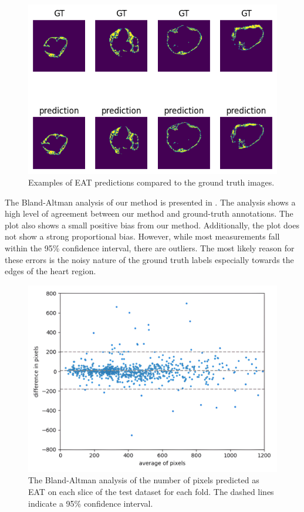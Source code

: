 \begin{figure}[h]
    \centering
    \includegraphics[width=0.7\columnwidth]{images/6/examples.png}
    \caption{Examples of EAT predictions compared to the ground truth images. \cite{bencevicEpicardialAdiposeTissue2021}}
    \label{fig:examples}
\end{figure}

The Bland-Altman analysis of our method is presented in . The analysis shows a high level of agreement between our method and ground-truth annotations. The plot also shows a small positive bias from our method. Additionally, the plot does not show a strong proportional bias. However, while most measurements fall within the 95\% confidence interval, there are outliers. The most likely reason for these errors is the noisy nature of the ground truth labels especially towards the edges of the heart region.

\begin{figure}[h]
    \centering
    \includegraphics[width=0.75\columnwidth]{images/6/blaltman.jpg}
    \caption{The Bland-Altman analysis of the number of pixels predicted as EAT on each slice of the test dataset for each fold. The dashed lines indicate a 95\% confidence interval. \cite{bencevicEpicardialAdiposeTissue2021}}
    \label{fig:corr}
\end{figure}

